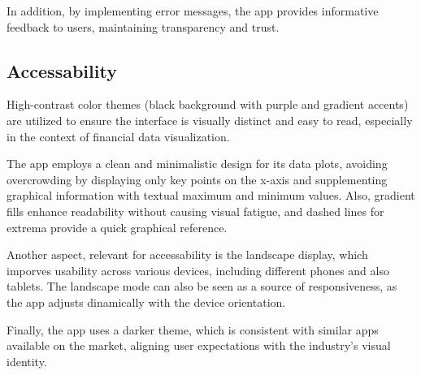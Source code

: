 \documentclass{article}
\begin{document}
In addition, by implementing error messages, the app provides informative feedback to users, maintaining transparency and trust.
    

\subsection{Accessability}
High-contrast color themes (black background with purple and gradient accents) are utilized to ensure the interface is visually distinct and easy to read, especially in the context of financial data visualization.

The app employs a clean and minimalistic design for its data plots, avoiding overcrowding by displaying only key points on the x-axis and supplementing graphical information with textual maximum and minimum values.
Also, gradient fills enhance readability without causing visual fatigue, and dashed lines for extrema provide a quick graphical reference.

Another aspect, relevant for accessability is the landscape display, which imporves usability across various devices, including different phones and also tablets.
The landscape mode can also be seen as a source of responsiveness, as the app adjusts dinamically with the device orientation.

Finally, the app uses a darker theme, which is consistent with similar apps available on the market, aligning user expectations with the industry's visual identity.



\end{document}
